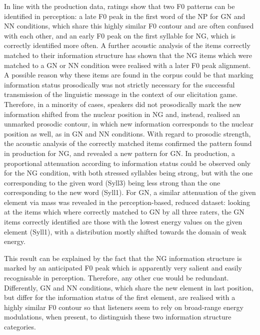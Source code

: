 \begin{styleStandard}
In line with the production data, ratings show that two F0 patterns can be identified in perception: a late F0 peak in the first word of the NP for GN and NN conditions, which share this highly similar F0 contour and are often confused with each other, and an early F0 peak on the first syllable for NG, which is correctly identified more often. A further acoustic analysis of the items correctly matched to their information structure has shown that the NG items which were matched to a GN or NN condition were realised with a later F0 peak alignment. A possible reason why these items are found in the corpus could be that marking information status prosodically was not strictly necessary for the successful transmission of the linguistic message in the context of our elicitation game. Therefore, in a minority of cases, speakers did not prosodically mark the new information shifted from the nuclear position in NG and, instead, realised an unmarked prosodic contour, in which new information corresponds to the nuclear position as well, as in GN and NN conditions. With regard to prosodic strength, the acoustic analysis of the correctly matched items confirmed the pattern found in production for NG, and revealed a new pattern for GN. In production, a proportional attenuation according to information status could be observed only for the NG condition, with both stressed syllables being strong, but with the one corresponding to the given word (Syll3) being less strong than the one corresponding to the new word (Syll1). For GN, a similar attenuation of the given element via mass was revealed in the perception-based, reduced dataset: looking at the items which where correctly matched to GN by all three raters, the GN items correctly identified are those with the lowest energy values on the given element (Syll1), with a distribution mostly shifted towards the domain of weak energy.
\end{styleStandard}

\begin{styleStandard}
This result can be explained by the fact that the NG information structure is marked by an anticipated F0 peak which is apparently very salient and easily recognisable in perception. Therefore, any other cue would be redundant. Differently, GN and NN conditions, which share the new element in last position, but differ for the information status of the first element, are realised with a highly similar F0 contour so that listeners seem to rely on broad-range energy modulations, when present, to distinguish these two information structure categories.
\end{styleStandard}

